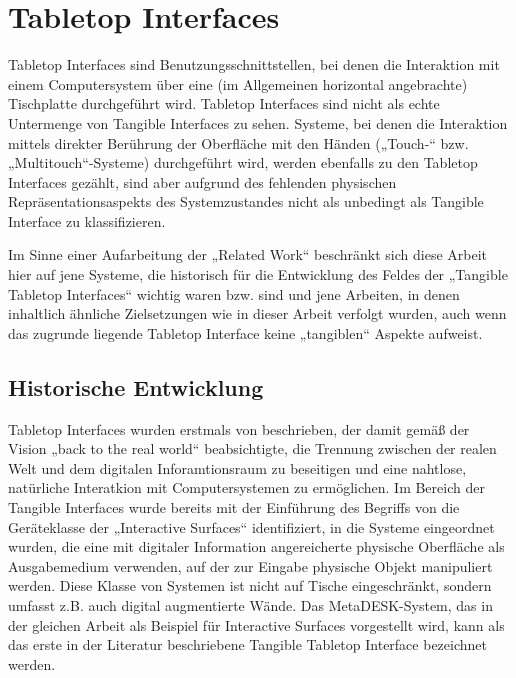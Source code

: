 

\section{Tabletop Interfaces} %
\label{sec:tabletop_interfaces}

Tabletop Interfaces sind Benutzungsschnittstellen, bei denen die Interaktion mit einem Computersystem über eine (im Allgemeinen horizontal angebrachte) Tischplatte durchgeführt wird. Tabletop Interfaces sind nicht als echte Untermenge von Tangible Interfaces zu sehen. Systeme, bei denen die Interaktion mittels direkter Berührung der Oberfläche mit den Händen („Touch-“ bzw. „Multitouch“-Systeme) durchgeführt wird, werden ebenfalls zu den Tabletop Interfaces gezählt, sind aber aufgrund des fehlenden physischen Repräsentationsaspekts des Systemzustandes nicht als unbedingt als Tangible Interface zu klassifizieren.

Im Sinne einer Aufarbeitung der „Related Work“ beschränkt sich diese Arbeit hier auf jene Systeme, die historisch für die Entwicklung des Feldes der „Tangible Tabletop Interfaces“ wichtig waren bzw. sind und jene Arbeiten, in denen inhaltlich ähnliche Zielsetzungen wie in dieser Arbeit verfolgt wurden, auch wenn das zugrunde liegende Tabletop Interface keine „tangiblen“ Aspekte aufweist.

\subsection{Historische Entwicklung} %
\label{sub:historische_entwicklung_von_tabletop_interfaces}

Tabletop Interfaces wurden erstmals von \citet{Wellner93a} beschrieben, der damit gemäß der Vision „back to the real world“ \citet{Wellner93} beabsichtigte, die Trennung zwischen der realen Welt und dem digitalen Inforamtionsraum zu beseitigen und eine nahtlose, natürliche Interatkion mit Computersystemen zu ermöglichen. Im Bereich der Tangible Interfaces wurde bereits mit der Einführung des Begriffs von \citet{Ishii97} die Geräteklasse der „Interactive Surfaces“ identifiziert, in die Systeme eingeordnet wurden, die eine mit digitaler Information angereicherte physische Oberfläche als Ausgabemedium verwenden, auf der zur Eingabe physische Objekt manipuliert werden. Diese Klasse von Systemen ist nicht auf Tische eingeschränkt, sondern umfasst z.B. auch digital augmentierte Wände. Das MetaDESK-System, das in der gleichen Arbeit als Beispiel für Interactive Surfaces vorgestellt wird, kann als das erste in der Literatur beschriebene Tangible Tabletop Interface bezeichnet werden. 

